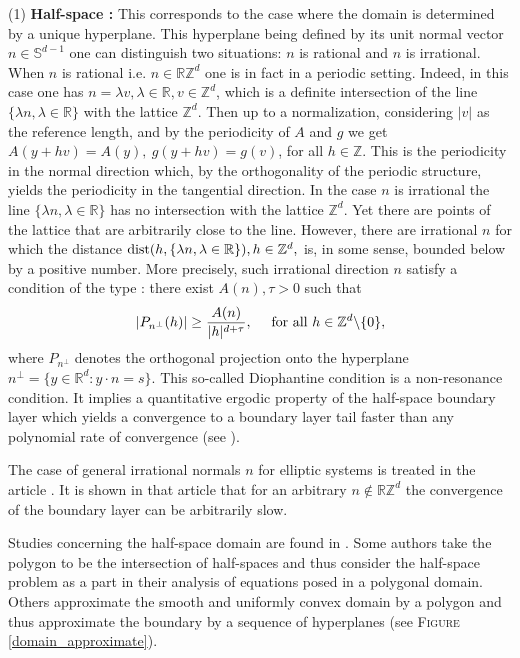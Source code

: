 \documentclass[11pt, reqno]{amsart}
\theoremstyle{definition}
\theoremstyle{remark}
\numberwithin{equation}{section}
\newcommand{\bs}{\symbol{92}}
\DeclareMathOperator*{\dist}{\textup{dist}}
\begin{document}
	
 \noindent(1) \textbf{Half-space :} This corresponds to the case where the domain is determined by a unique hyperplane. This hyperplane being defined by its unit normal vector $n\in \mathbb{S}^{d-1}$  one can distinguish two situations: $n $ is rational and $n$ is irrational. When $n$ is rational i.e. $n\in \mathbb{R}\mathbb{Z}^{d}$ one is in fact in a periodic setting. Indeed, in this case one has $n=\lambda v, \lambda\in\mathbb{R}, v\in\mathbb{Z}^d$, which is a definite intersection of the line $\{\lambda n, \lambda\in\mathbb{R} \}$ with the lattice $\mathbb{Z}^d$. Then up to a normalization, considering $|v|$ as the reference length, and by the periodicity of $A$ and $g$ we get $A(y+hv)=A(y), \ g(y+hv)=g(v)$, for all $h\in\mathbb{Z}$. This is the periodicity in the normal direction which, by the orthogonality of the periodic structure, yields the periodicity in the tangential direction. In the case  $n$ is irrational the line $\{\lambda n, \lambda\in\mathbb{R} \}$ has no intersection with the lattice $\mathbb{Z}^d$. Yet there are points of the lattice that are arbitrarily close to the line. However, there are irrational $n$ for which  the distance  $\dist(h, \{\lambda n, \lambda\in\mathbb{R} \} ), h\in \mathbb{Z}^d,$ is, in some sense, bounded below by a positive number. More precisely, such irrational direction $n$ satisfy a condition of the type : there exist $A(n),\tau>0$ such that
		\begin{align}\label{Dioph}
			| P_{n^\perp} (h)| \geq \frac{A(n)}{|h|^{d+\tau}},\quad  \mbox{ for all } h\in \mathbb{Z}^d\bs \{0\},
		\end{align}
	 where $P_{n^\perp}$ denotes the orthogonal projection onto the hyperplane $n^\perp =\{y\in\mathbb{R}^d:y\cdot n= s\}.$ 
		This so-called Diophantine condition is a non-resonance condition. It implies a quantitative ergodic property  of the half-space boundary layer which yields a convergence to a boundary layer tail faster than any polynomial rate of convergence  (see \cite{homogen_polygon,Slip_cond}).
		
		
		The case of general irrational normals  $n$ for elliptic systems is treated in the article \cite{Prange}. It is shown in that article that for an arbitrary $n\notin \mathbb{R}\mathbb{Z}^{d}$ the convergence of the boundary layer can be arbitrarily slow.
		
		Studies concerning the half-space domain are found in \cite{AKMP,fully_nonlin,homogen_bl}. Some authors take the polygon to be the intersection of half-spaces and thus consider the half-space problem as a part in their analysis of  equations posed in a polygonal domain. Others approximate the smooth and uniformly convex domain by a polygon and thus approximate the boundary by a sequence of hyperplanes (see \textsc{Figure} \ref{domain_approximate}).
		
\end{document}
